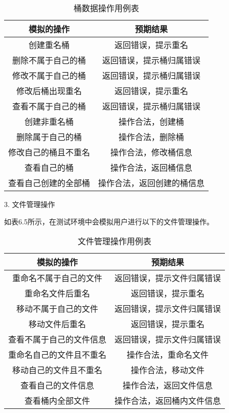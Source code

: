\begin{table}[h]
  \centering
  \caption{桶数据操作用例表}
  \begin{tabular}{cc}
    \toprule
    模拟的操作   & 预期结果   \\
    \midrule
    创建重名桶           & 返回错误，提示重名  \\
    删除不属于自己的桶    & 返回错误，提示桶归属错误     \\
    修改不属于自己的桶    & 返回错误，提示桶归属错误  \\
    修改后桶出现重名      & 返回错误，提示重名  \\
    查看不属于自己的桶    & 返回错误，提示桶归属错误     \\
    创建非重名桶          & 操作合法，创建桶  \\
    删除属于自己的桶      & 操作合法，删除桶     \\
    修改自己的桶且不重名   & 操作合法，修改桶信息  \\
    查看自己的桶          & 操作合法，返回桶信息     \\
    查看自己创建的全部桶   & 操作合法，返回创建的桶信息     \\
    \bottomrule
  \end{tabular}
\end{table}

3. 文件管理操作

如表6.5所示，在测试环境中会模拟用户进行以下的文件管理操作。

\begin{table}[h]
  \centering
  \caption{文件管理操作用例表}
  \begin{tabular}{cc}
    \toprule
    模拟的操作   & 预期结果   \\
    \midrule
    重命名不属于自己的文件     & 返回错误，提示文件归属错误  \\
    重命名文件后重名          & 返回错误，提示重名     \\
    移动不属于自己的文件       & 返回错误，提示文件归属错误  \\
    移动文件后重名            & 返回错误，提示重名  \\
    查看不属于自己的文件信息   & 返回错误，提示文件归属错误     \\
    重命名自己的文件且不重名   & 操作合法，重命名文件  \\
    移动自己的文件且不重名     & 操作合法，移动文件     \\
    查看自己的文件信息        & 操作合法，返回文件信息  \\
    查看桶内全部文件          & 操作合法，返回桶内文件信息     \\
    \bottomrule
  \end{tabular}
\end{table}

